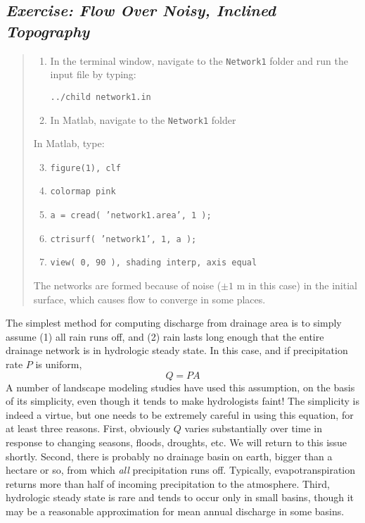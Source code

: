 \documentclass[12pt,reqno]{amsart}
\begin{document}
\subsection*{\em Exercise: Flow Over Noisy, Inclined Topography}

\begin{quote}
\small
{\sf
\begin{enumerate}
\item
In the terminal window, navigate to the {\tt Network1} folder and run the input file by typing:

{\tt ../child network1.in}
\item
In Matlab, navigate to the {\tt Network1} folder
\end{enumerate}

In Matlab, type:
\begin{enumerate}
\setcounter{enumi}{2}
\item
{\tt figure(1), clf}
\item
{\tt colormap pink}
\item
{\tt a = cread( 'network1.area', 1 );}
\item
{\tt ctrisurf( 'network1', 1, a );}
\item
{\tt view( 0, 90 ), shading interp, axis equal}
\end{enumerate}

The networks are formed because of noise ($\pm1$ m in this case) in the initial surface, which causes flow to converge in some places.
}
\end{quote}

The simplest method for computing discharge from drainage area is to simply assume (1) all rain runs off, and (2) rain lasts long enough that the entire drainage network is in hydrologic steady state. In this case, and if precipitation rate $P$ is uniform,
\begin{equation}
Q = PA
\end{equation}
A number of landscape modeling studies have used this assumption, on the basis of its simplicity, even though it tends to make hydrologists faint! The simplicity is indeed a virtue, but one needs to be extremely careful in using this equation, for at least three reasons. First, obviously $Q$ varies substantially over time in response to changing seasons, floods, droughts, etc. We will return to this issue shortly. Second, there is probably no drainage basin on earth, bigger than a hectare or so, from which {\em all} precipitation runs off. Typically, evapotranspiration returns more than half of incoming precipitation to the atmosphere. Third, hydrologic steady state is rare and tends to occur only in small basins, though it may be a reasonable approximation for mean annual discharge in some basins.
\end{document}
